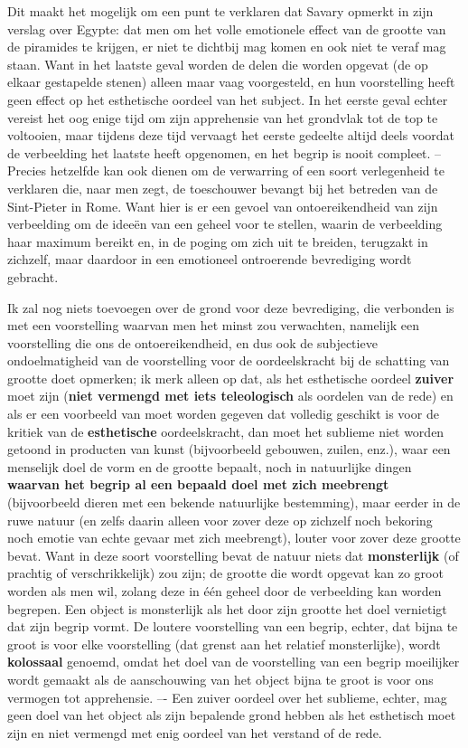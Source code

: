 Dit maakt het mogelijk om een punt te verklaren dat Savary opmerkt in zijn verslag over Egypte: dat men om het volle emotionele effect van de grootte van de piramides te krijgen, er niet te dichtbij mag komen en ook niet te veraf mag staan. Want in het laatste geval worden de delen die worden opgevat (de op elkaar gestapelde stenen) alleen maar vaag voorgesteld, en hun voorstelling heeft geen effect op het esthetische oordeel van het subject. In het eerste geval echter vereist het oog enige tijd om zijn apprehensie van het grondvlak tot de top te voltooien, maar tijdens deze tijd vervaagt het eerste gedeelte altijd deels voordat de verbeelding het laatste heeft opgenomen, en het begrip is nooit compleet. --
Precies hetzelfde kan ook dienen om de verwarring of een soort verlegenheid te verklaren die, naar men zegt, de toeschouwer bevangt bij het betreden van de Sint-Pieter in Rome. Want hier is er een gevoel van ontoereikendheid van zijn verbeelding om de ideeën van een geheel voor te stellen, waarin de verbeelding haar maximum bereikt en, in de poging om zich uit te breiden, terugzakt in zichzelf, maar daardoor in een emotioneel ontroerende bevrediging wordt gebracht.

Ik zal nog niets toevoegen over de grond voor deze bevrediging, die verbonden is met een voorstelling waarvan men het minst zou verwachten, namelijk een voorstelling die ons de ontoereikendheid, en dus ook de subjectieve ondoelmatigheid van de voorstelling voor de oordeelskracht bij de schatting van grootte doet opmerken; ik merk alleen op dat, als het esthetische oordeel \textbf{zuiver} moet zijn (\textbf{niet vermengd met iets teleologisch} als oordelen van de rede) en als er een voorbeeld van moet worden gegeven dat volledig geschikt is voor de kritiek van de \textbf{esthetische} oordeelskracht, dan moet het sublieme niet worden getoond in producten van kunst (bijvoorbeeld gebouwen, zuilen, enz.), waar een menselijk doel de vorm en de grootte bepaalt, noch in natuurlijke dingen \textbf{waarvan het begrip al een bepaald doel met zich meebrengt} (bijvoorbeeld dieren met een bekende natuurlijke bestemming), maar eerder in de ruwe natuur (en zelfs daarin alleen voor zover deze op zichzelf noch bekoring noch emotie van echte gevaar met zich meebrengt), louter voor zover deze grootte bevat.
Want in deze soort voorstelling bevat de natuur niets dat \textbf{monsterlijk} (of prachtig of verschrikkelijk) zou zijn; de grootte die wordt opgevat kan zo groot worden als men wil, zolang deze in één geheel door de verbeelding kan worden begrepen. Een object is monsterlijk als het door zijn grootte het doel vernietigt dat zijn begrip vormt.
De loutere voorstelling van een begrip, echter, dat bijna te groot is voor elke voorstelling (dat grenst aan het relatief monsterlijke), wordt \textbf{kolossaal} genoemd, omdat het doel van de voorstelling van een begrip moeilijker wordt gemaakt als de aanschouwing van het object bijna te groot is voor ons vermogen tot apprehensie. –- Een zuiver oordeel over het sublieme, echter, mag geen doel van het object als zijn bepalende grond hebben als het esthetisch moet zijn en niet vermengd met enig oordeel van het verstand of de rede.

